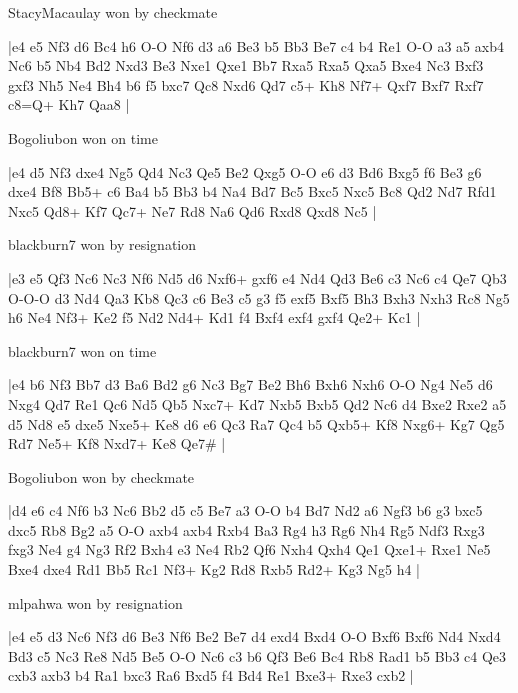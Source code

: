 \showboard

StacyMacaulay won by checkmate

\makegametitle
|e4 e5 Nf3 d6 Bc4 h6 O-O Nf6 d3 a6 Be3 b5 Bb3 Be7 c4 b4 Re1 O-O a3 a5 axb4 Nc6 b5 Nb4 Bd2 Nxd3 Be3 Nxe1 Qxe1 Bb7 Rxa5 Rxa5 Qxa5 Bxe4 Nc3 Bxf3 gxf3 Nh5 Ne4 Bh4 b6 f5 bxc7 Qc8 Nxd6 Qd7 c5+ Kh8 Nf7+ Qxf7 Bxf7 Rxf7 c8=Q+ Kh7 Qaa8  |

\showboard

Bogoliubon won on time

\makegametitle
|e4 d5 Nf3 dxe4 Ng5 Qd4 Nc3 Qe5 Be2 Qxg5 O-O e6 d3 Bd6 Bxg5 f6 Be3 g6 dxe4 Bf8 Bb5+ c6 Ba4 b5 Bb3 b4 Na4 Bd7 Bc5 Bxc5 Nxc5 Bc8 Qd2 Nd7 Rfd1 Nxc5 Qd8+ Kf7 Qc7+ Ne7 Rd8 Na6 Qd6 Rxd8 Qxd8 Nc5  |

\showboard

blackburn7 won by resignation

\makegametitle
|e3 e5 Qf3 Nc6 Nc3 Nf6 Nd5 d6 Nxf6+ gxf6 e4 Nd4 Qd3 Be6 c3 Nc6 c4 Qe7 Qb3 O-O-O d3 Nd4 Qa3 Kb8 Qc3 c6 Be3 c5 g3 f5 exf5 Bxf5 Bh3 Bxh3 Nxh3 Rc8 Ng5 h6 Ne4 Nf3+ Ke2 f5 Nd2 Nd4+ Kd1 f4 Bxf4 exf4 gxf4 Qe2+ Kc1  |

\showboard

blackburn7 won on time

\makegametitle
|e4 b6 Nf3 Bb7 d3 Ba6 Bd2 g6 Nc3 Bg7 Be2 Bh6 Bxh6 Nxh6 O-O Ng4 Ne5 d6 Nxg4 Qd7 Re1 Qc6 Nd5 Qb5 Nxc7+ Kd7 Nxb5 Bxb5 Qd2 Nc6 d4 Bxe2 Rxe2 a5 d5 Nd8 e5 dxe5 Nxe5+ Ke8 d6 e6 Qc3 Ra7 Qc4 b5 Qxb5+ Kf8 Nxg6+ Kg7 Qg5 Rd7 Ne5+ Kf8 Nxd7+ Ke8 Qe7\#  |

\showboard

Bogoliubon won by checkmate

\makegametitle
|d4 e6 c4 Nf6 b3 Nc6 Bb2 d5 c5 Be7 a3 O-O b4 Bd7 Nd2 a6 Ngf3 b6 g3 bxc5 dxc5 Rb8 Bg2 a5 O-O axb4 axb4 Rxb4 Ba3 Rg4 h3 Rg6 Nh4 Rg5 Ndf3 Rxg3 fxg3 Ne4 g4 Ng3 Rf2 Bxh4 e3 Ne4 Rb2 Qf6 Nxh4 Qxh4 Qe1 Qxe1+ Rxe1 Ne5 Bxe4 dxe4 Rd1 Bb5 Rc1 Nf3+ Kg2 Rd8 Rxb5 Rd2+ Kg3 Ng5 h4  |

\showboard

mlpahwa won by resignation

\makegametitle
|e4 e5 d3 Nc6 Nf3 d6 Be3 Nf6 Be2 Be7 d4 exd4 Bxd4 O-O Bxf6 Bxf6 Nd4 Nxd4 Bd3 c5 Nc3 Re8 Nd5 Be5 O-O Nc6 c3 b6 Qf3 Be6 Bc4 Rb8 Rad1 b5 Bb3 c4 Qe3 cxb3 axb3 b4 Ra1 bxc3 Ra6 Bxd5 f4 Bd4 Re1 Bxe3+ Rxe3 cxb2  |

